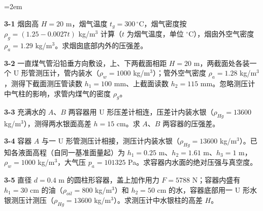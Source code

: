 \begin{ti}\sloppy\emergencystretch=2em
\item[\textbf{3-1}] 烟囱高 $H=20$ m，烟气温度 $t_g=300\,\mathrm{^\circ C}$，烟气密度按 $\rho_g=(1.25-0.0027t)$ kg/m$^3$ 计算（$t$ 为烟气温度，单位 $\mathrm{^\circ C}$），烟囱外空气密度 $\rho_a=1.29$ kg/m$^3$。求烟囱底部内外的压强差。
\quad{}\quad{}

\item[\textbf{3-2}] 一直煤气管沿铅垂方向敷设，上、下两截面相距 $H=20$ m，两截面处各装一个 U 形管测压计，管内装水（$\rho_w=1000$ kg/m$^3$）；管外空气密度 $\rho_a=1.28$ kg/m$^3$，测得下截面测压管读数 $h_1=100$ mm、上截面读数 $h_2=115$ mm。忽略测压计中气柱的影响，求管内煤气的密度 $\rho_g$。
\quad{}\quad{}

\item[\textbf{3-3}] 充满水的 $A$、$B$ 两容器用 U 形压差计相连，压差计内装水银（$\rho_{Hg}=13600$ kg/m$^3$），测得两水银面高差 $h=15$ cm。求 $A$、$B$ 两容器的压强差。
\quad{}\quad{}

\item[\textbf{3-4}] 容器 $A$ 与一 U 形管测压计相接，测压计内装水银（$\rho_{Hg}=13600$ kg/m$^3$）。已知各液面高程（自同一基准面量起）为 $h_1=0.25$ m、$h_2=1.61$ m、$h_3=1$ m，$\rho_w=1000$ kg/m$^3$，大气压 $p_a=101325$ Pa。求容器内水面的绝对压强与真空度。
\quad{}\quad{}

\item[\textbf{3-5}] 直径 $d=0.4$ m 的圆柱形容器，盖上加作用力 $F=5788$ N；容器内盛有 $h_1=30$ cm 的油（$\rho_{oil}=800$ kg/m$^3$）和 $h_2=50$ cm 的水，容器底部用一 U 形水银测压计测压（$\rho_{Hg}=13600$ kg/m$^3$）。求测压计中水银柱的高差 $H$。
\quad{}\quad{}


\end{ti}
